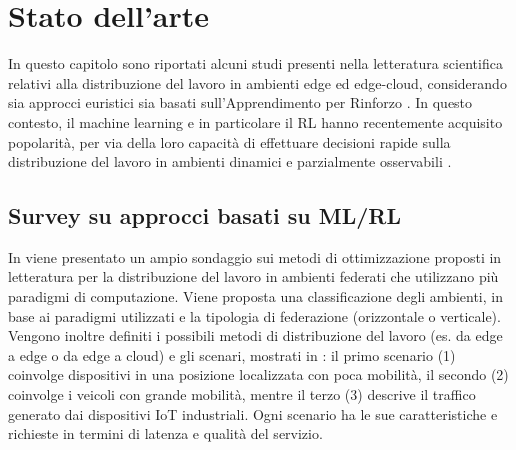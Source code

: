 \chapter{Stato dell'arte}
\label{sec:3_stato_arte}

In questo capitolo sono riportati alcuni studi presenti nella letteratura scientifica relativi alla distribuzione del lavoro in ambienti edge ed edge-cloud, considerando sia approcci euristici \cite{Chai2021, Hsieh2023} sia basati sull'Apprendimento per Rinforzo \cite{Liu2023, Zhang2023}. In questo contesto, il machine learning e in particolare il RL hanno recentemente acquisito popolarità, per via della loro capacità di effettuare decisioni rapide sulla distribuzione del lavoro in ambienti dinamici e parzialmente osservabili \cite{Hortelano2023, Kar2023}.

\section{Survey su approcci basati su ML/RL}

In \cite{Kar2023} viene presentato un ampio sondaggio sui metodi di ottimizzazione proposti in letteratura per la distribuzione del lavoro in ambienti federati che utilizzano più paradigmi di computazione. Viene proposta una classificazione degli ambienti, in base ai paradigmi utilizzati e la tipologia di federazione (orizzontale o verticale). Vengono inoltre definiti i possibili metodi di distribuzione del lavoro (es. da edge a edge o da edge a cloud) e gli scenari, mostrati in : il primo scenario (1) coinvolge dispositivi in una posizione localizzata con poca mobilità, il secondo (2) coinvolge i veicoli con grande mobilità, mentre il terzo (3) descrive il traffico generato dai dispositivi IoT industriali. Ogni scenario ha le sue caratteristiche e richieste in termini di latenza e qualità del servizio.

